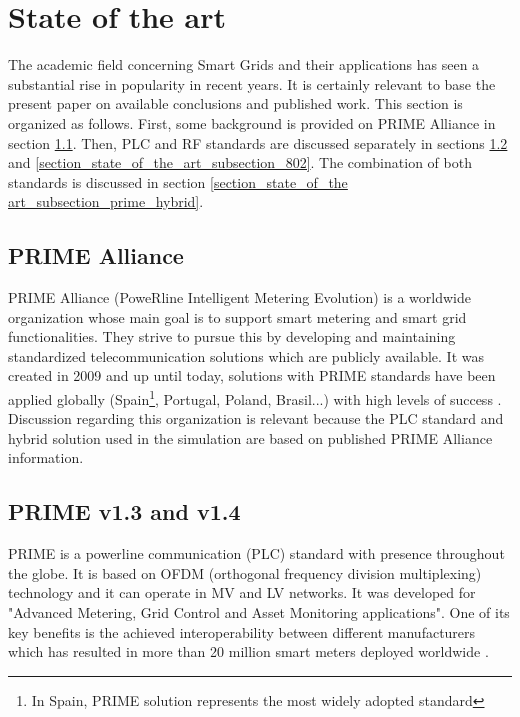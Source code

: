 \section{State of the art}\label{section_state_of_the_art}

The academic field concerning Smart Grids and their applications has seen a substantial rise in popularity in recent years. It is certainly relevant to base the present paper on available conclusions and published work. This section is organized as follows. First, some background is provided on PRIME Alliance in section \ref{section_state_of_the_art_subsection_PRIME_Alliance}. Then, PLC and RF standards are discussed separately in sections \ref{section_state_of_the_art_subsection_PRIME_13_14} and \ref{section_state_of_the_art_subsection_802}. The combination of both standards is discussed in section \ref{section_state_of_the art_subsection_prime_hybrid}.


\subsection{PRIME Alliance}\label{section_state_of_the_art_subsection_PRIME_Alliance}
PRIME Alliance (PoweRline Intelligent Metering Evolution) is a worldwide organization whose main goal is to support smart metering and smart grid functionalities. They strive to pursue this by developing and maintaining standardized telecommunication solutions which are publicly available. It was created in 2009 and up until today, solutions with PRIME standards have been applied globally (Spain\footnote{In Spain, PRIME solution represents the most widely adopted standard}, Portugal, Poland, Brasil...) with high levels of success \cite{prime_alliance_description_document}. Discussion regarding this organization is relevant because the PLC standard and hybrid solution used in the simulation are based on published PRIME Alliance information.

\subsection{PRIME v1.3 and v1.4}\label{section_state_of_the_art_subsection_PRIME_13_14}
PRIME is a powerline communication (PLC) standard with presence throughout the globe. It is based on OFDM (orthogonal frequency division multiplexing) technology and it can operate in MV and LV networks. It was developed for "Advanced Metering, Grid Control and Asset Monitoring applications". One of its key benefits is the achieved interoperability between different manufacturers which has resulted in more than 20 million smart meters deployed worldwide \cite{prime_alliance_description_document}.

